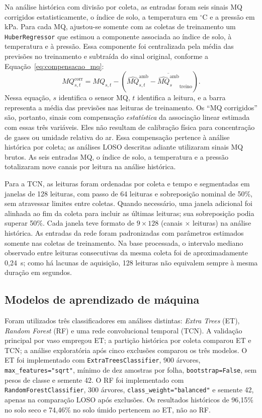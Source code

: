 Na análise histórica com divisão por coleta, as entradas foram seis
sinais MQ corrigidos estatisticamente, o índice de solo, a temperatura em $^{\circ}$C e a
pressão em kPa. Para cada MQ, ajustou-se somente com as coletas de
treinamento um \texttt{HuberRegressor} que estimou a componente associada
ao índice de solo, à temperatura e à pressão. Essa componente foi
centralizada pela média das previsões no treinamento e subtraída do
sinal original, conforme a Equação~\eqref{eq:compensacao_mq}:
\begin{equation}
    \label{eq:compensacao_mq}
    MQ_{s,t}^{\mathrm{corr}} = MQ_{s,t} -
    \left(\widehat{MQ}_{s,t}^{\mathrm{amb}}-
    \overline{\widehat{MQ}_{s}^{\mathrm{amb}}}_{\mathrm{treino}}\right).
\end{equation}
Nessa equação, $s$ identifica o sensor MQ, $t$ identifica a leitura, e a
barra representa a média das previsões nas leituras de treinamento. Os
``MQ corrigidos'' são, portanto, sinais com compensação \emph{estatística}
da associação linear estimada com essas três variáveis. Eles não resultam
de calibração física para concentração de gases ou umidade relativa do ar.
Essa compensação pertence à análise histórica por coleta; as análises LOSO
descritas adiante utilizaram sinais MQ brutos. As seis entradas MQ, o
índice de solo, a temperatura e a pressão totalizaram nove canais por
leitura na análise histórica.

Para a TCN, as leituras foram ordenadas por coleta e tempo e segmentadas
em janelas de 128 leituras, com passo de 64 leituras e sobreposição nominal
de 50\%, sem atravessar limites entre coletas. Quando necessário, uma
janela adicional foi alinhada ao fim da coleta para incluir as últimas
leituras; sua sobreposição podia superar 50\%. Cada janela teve formato de
$9\times128$ (canais $\times$ leituras) na análise histórica. As entradas
da rede foram padronizadas com parâmetros estimados somente nas coletas de
treinamento. Na base processada, o intervalo mediano observado entre
leituras consecutivas da mesma coleta foi de aproximadamente 0,24~s;
como há lacunas de aquisição, 128 leituras não equivalem sempre à mesma
duração em segundos.


\subsection{Modelos de aprendizado de máquina}
\label{subsec:modelos}

Foram utilizados três classificadores em análises distintas:
\emph{Extra Trees} (ET), \emph{Random Forest} (RF) e uma rede
convolucional temporal (TCN). A validação principal por vaso empregou
ET; a partição histórica por coleta comparou ET e TCN; a análise
exploratória após cinco exclusões comparou os três modelos. O ET foi
implementado com
\texttt{ExtraTreesClassifier}, 900 árvores,
\texttt{max\_features="sqrt"}, mínimo de dez amostras por folha,
\texttt{bootstrap=False}, sem pesos de classe e semente 42.
O RF foi implementado com \texttt{RandomForestClassifier}, 300 árvores,
\texttt{class\_weight="balanced"} e semente 42, apenas na comparação
LOSO após exclusões. Os resultados históricos de 96,15\% no solo seco
e 74,46\% no solo úmido pertencem ao ET, não ao RF.

